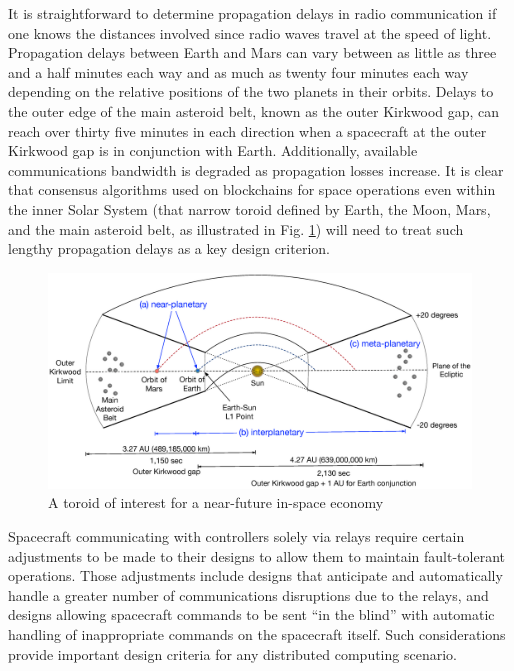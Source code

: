 \documentclass[]{aiaa-tc}%
\begin{document}
It is straightforward to determine propagation delays in radio communication if one knows the distances involved since radio waves travel at the speed of light. Propagation delays between Earth and Mars can vary between as little as three and a half minutes each way and as much as twenty four minutes each way depending on the relative positions of the two planets in their orbits. Delays to the outer edge of the main asteroid belt, known as the outer Kirkwood gap, can reach over thirty five minutes in each direction when a spacecraft at the outer Kirkwood gap is in conjunction with Earth. Additionally, available communications bandwidth is degraded as propagation losses increase. It is clear that consensus algorithms used on blockchains for space operations even within the inner Solar System (that narrow toroid defined by Earth, the Moon, Mars, and the main asteroid belt, as illustrated in Fig. \ref{f:fig1-toroid-of-interest}) will need to treat such lengthy propagation delays as a key design criterion.

\begin{figure}[htb]%
 \includegraphics{figures/fig1-toroid-of-interest}
 \caption{A toroid of interest for a near-future in-space economy}
 \label{f:fig1-toroid-of-interest}
\end{figure}

Spacecraft communicating with controllers solely via relays require certain adjustments to be made to their designs to allow them to maintain fault-tolerant operations\cite{lewicki_phoenix_2006}. Those adjustments include designs that anticipate and automatically handle a greater number of communications disruptions due to the relays, and designs allowing spacecraft commands to be sent ``in the blind'' with automatic handling of inappropriate commands on the spacecraft itself. Such considerations provide important design criteria for any distributed computing scenario.
\end{document}
